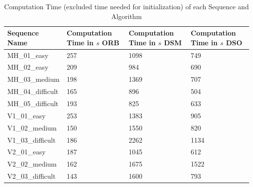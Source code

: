 	\begin{table}
	\caption{Computation Time (excluded time needed for initialization) of each Sequence and Algorithm}
	\begin{tabular}{ |p{3cm}||p{3cm}|p{3cm}|p{3cm}|  }
	\hline
	Sequence Name& Computation Time in $s$ ORB & Computation Time in $s$ DSM & Computation Time in $s$ DSO \\
	\hline
	MH\_01\_easy & 257 & 1098 & 749\\
	MH\_02\_easy & 209 & 984 & 690\\
	MH\_03\_medium & 198 & 1369 & 707\\
	MH\_04\_difficult & 165 & 896 & 504\\
	MH\_05\_difficult & 193 & 825 & 633\\
	V1\_01\_easy & 253 & 1383 & 905\\
	V1\_02\_medium & 150 & 1550 & 820\\
	V1\_03\_difficult & 186 & 2262 & 1134\\
	V2\_01\_easy & 187 & 1045 & 612\\
	V2\_02\_medium & 162 & 1675 & 1522\\
	V2\_03\_difficult & 143 & 1600 & 793\\
	\hline
	\end{tabular}
	\label{table:comp_time}
	\end{table}

